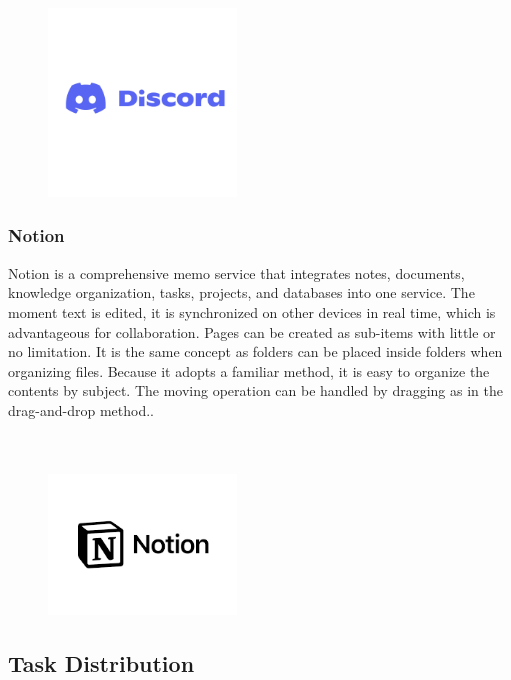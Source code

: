 \documentclass[conference]{IEEEtran}
\begin{document}
\begin{figure}[t!]
\centering
\includegraphics[width=5cm]{imagefolder/discord.png}
\caption{}
\label{fig:map}
\end{figure}

\subsubsection{Notion}
Notion is a comprehensive memo service that integrates notes, documents, knowledge organization, tasks, projects, and databases into one service. The moment text is edited, it is synchronized on other devices in real time, which is advantageous for collaboration. Pages can be created as sub-items with little or no limitation. It is the same concept as folders can be placed inside folders when organizing files. Because it adopts a familiar method, it is easy to organize the contents by subject. The moving operation can be handled by dragging as in the drag-and-drop method..\\
\\
\\

\begin{figure}[h!]
\centering
\includegraphics[width=5cm]{imagefolder/notion.png}
\caption{}
\label{fig:map}
\end{figure}


\subsection{Task Distribution}\;
\end{document}
